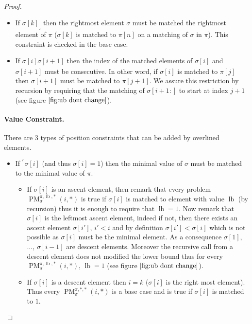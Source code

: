\documentclass[a4paper]{llncs}
\newcommand{\ptext}{\pi}
\newcommand{\ppattern}{\sigma}
\DeclareMathOperator{\PMa}{PM}
\newcommand{\PM}[6]{\PMa_{{#1}}^{{#2},{#3},{#4}}({#5},{#6})}
\DeclareMathOperator{\lb}{lb}
\begin{document}
\begin{proof}
\begin{itemize}
	\item If ${\ppattern[k]}_\lrcorner$ then the rightmost element $\sigma$ must be matched the rightmost element of $\pi$ ($\ppattern[k]$ is matched to $\ptext[n]$ on a matching of $\ppattern$ in $\ptext$). This constraint is checked in the base case.

	\item If $\underline{\ppattern[i]\ppattern[i+1]}$ then the index of the matched elements of $\ppattern[i]$ and $\ppattern[i+1]$ must be consecutive. In other word, if $\ppattern[i]$ is matched to $\ptext[j]$ then $\ppattern[i+1]$ must be matched to $\ptext[j+1]$. We assure this restriction by recursion by requiring that the matching of $\ppattern[i+1:]$ to start at index $j+1$ (see figure $\ref{fig:ub dont change}$).
\end{itemize}

\paragraph{Value Constraint.} There are 3 types of position constraints that can be added by overlined elements.
\begin{itemize}
	\item If $^\ulcorner{\sigma[i]}$ (and thus $\sigma[i]=1$) then the minimal value of $\ppattern$ must be matched to the minimal value of $\ptext$.
	\begin{itemize}

		\item If $\sigma[i]$ is an ascent element, then remark that 
		every problem 
		$\PM{\sigma}{\ptext}{\lb}{*}{i}{*}$ is true if $\sigma[i]$ is matched to element with value $\lb$ (by recursion) thus it is enough to require that $\lb=1$.
		Now remark that $\sigma[i]$ is the leftmost ascent element, indeed if not, then there exists an ascent element $\sigma[i']$, $i'<i$ and by definition $\sigma[i']<\sigma[i]$ which is not possible as $\sigma[i]$ must be the minimal element. 
		As a consequence $\sigma[1]$, $\ldots$, $\sigma[i-1]$ are descent elements.
		Moreover the recursive call from a descent element does not modified the lower bound
		thus for every $\PM{\sigma}{\ptext}{\lb}{*}{i}{*}$, $\lb=1$ (see figure $\ref{fig:ub dont change}$). 			

					
		\item If $\sigma[i]$ is a descent element then $i=k$ ($\sigma[i]$ is the right most element). Thus every $\PM{\sigma}{\ptext}{*}{*}{i}{*}$ is a base case and is true if $\sigma[i]$ is matched to $1$.


\end{itemize}
\end{itemize}
\end{proof}
\end{document}
